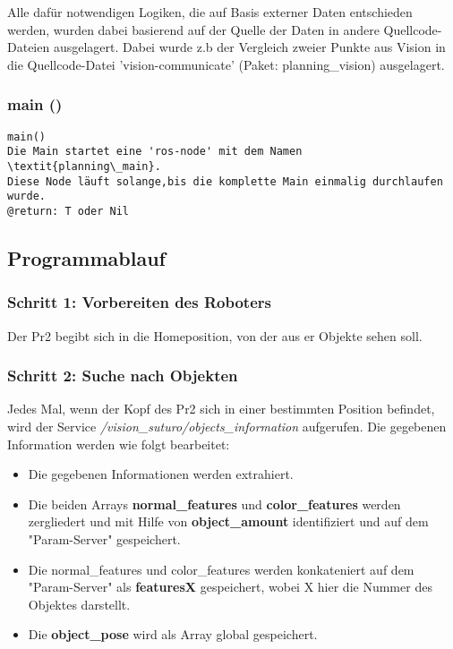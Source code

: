 \documentclass{suturo}
\begin{document}
Alle dafür notwendigen Logiken, die auf Basis externer Daten entschieden werden, wurden dabei basierend auf der Quelle der Daten in andere Quellcode-Dateien ausgelagert. Dabei wurde z.b der Vergleich zweier Punkte aus Vision in die Quellcode-Datei 'vision-communicate' (Paket: planning\_vision) ausgelagert.




\subsubsection{main ()}
\begin{verbatim}
main()
Die Main startet eine 'ros-node' mit dem Namen \textit{planning\_main}.
Diese Node läuft solange,bis die komplette Main einmalig durchlaufen wurde. 
@return: T oder Nil 
\end{verbatim}



\subsection{Programmablauf}
\subsubsection{Schritt 1: Vorbereiten des Roboters}
Der Pr2 begibt sich in die Homeposition, von der aus er Objekte sehen soll. 

\subsubsection{Schritt 2: Suche nach Objekten}
Jedes Mal, wenn der Kopf des Pr2 sich in einer bestimmten Position befindet, wird der Service \textit{/vision\_suturo/objects\_information} aufgerufen. Die gegebenen Information werden wie folgt bearbeitet:

\begin{itemize}
\item Die gegebenen Informationen werden extrahiert.
\item Die beiden Arrays \textbf{normal\_features} und \textbf{color\_features} werden zergliedert und mit Hilfe von \textbf{object\_amount} identifiziert und auf dem "Param-Server" gespeichert.
\item Die normal\_features und color\_features werden konkateniert auf dem "Param-Server" als \textbf{featuresX} gespeichert, wobei X hier die Nummer des Objektes darstellt.
\item Die \textbf{object\_pose} wird als Array global gespeichert.
\end{itemize}
\end{document}
